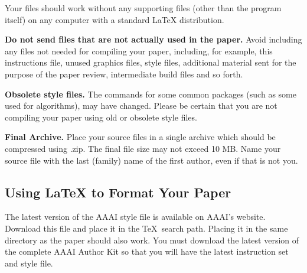 \documentclass[letterpaper]{article} %
\begin{document}
Your files should work without any supporting files (other than the
program itself) on any computer with a standard {\LaTeX} distribution.

\textbf{Do not send files that are not actually used in the paper.}
Avoid including any files not needed for compiling your paper,
including, for example, this instructions file, unused graphics files,
style files, additional material sent for the purpose of the paper
review, intermediate build files and so forth.

\textbf{Obsolete style files.} The commands for some common packages
(such as some used for algorithms), may have changed. Please be certain
that you are not compiling your paper using old or obsolete style files.

\textbf{Final Archive.} Place your source files in a single archive
which should be compressed using .zip. The final file size may not
exceed 10 MB. Name your source file with the last (family) name of the
first author, even if that is not you.

\subsection{\texorpdfstring{Using {\LaTeX} to Format Your
Paper}{Using  to Format Your Paper}}\label{using-to-format-your-paper}

The latest version of the AAAI style file is available on AAAI's
website. Download this file and place it in the \TeX~search path.
Placing it in the same directory as the paper should also work. You must
download the latest version of the complete AAAI Author Kit so that you
will have the latest instruction set and style file.
\end{document}
